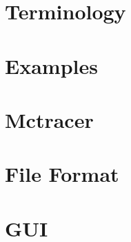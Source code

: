 \documentclass{scrartcl}
\begin{document}
\maketitle
\tableofcontents
\newpage

\section{Terminology} 
\newpage
\section{Examples} 
\newpage
\section{Mctracer} 
\newpage
\section{File Format} 
\newpage
\section{GUI} 
\end{document}
